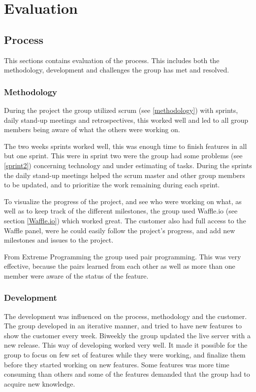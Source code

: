 
\chapter{Evaluation}

\section{Process}
\label{evaluationProcess}
This sections contains evaluation of the process. This includes both the methodology, development and challenges the group has met and resolved.

\subsection{Methodology}
\label{evaluationMethodology}
During the project the group utilized scrum (see \ref{methodology}) with sprints, daily stand-up meetings and retrospectives, this worked well and led to all group members being aware of what the others were working on. 

The two weeks sprints worked well, this was enough time to finish features in all but one sprint. This were in sprint two were the group had some problems (see \ref{sprint2}) concerning technology and under estimating of tasks. During the sprints the daily stand-up meetings helped the scrum master and other group members to be updated, and to prioritize the work remaining during each sprint. 

To visualize the progress of the project, and see who were working on what, as well as to keep track of the different milestones, the group used Waffle.io (see section \ref{Waffle.io}) which worked great. The customer also had full access to the Waffle panel, were he could easily follow the project's progress, and add new milestones and issues to the project.

From Extreme Programming the group used pair programming. This was very effective, because the pairs learned from each other as well as more than one member were aware of the status of the feature. 




\subsection{Development}

The development was influenced on the process, methodology and the customer. The group developed in an iterative manner, and tried to have new features to show the customer every week. Biweekly the group updated the live server with a new release. This way of developing worked very well. It made it possible for the group to focus on few set of features while they were working, and finalize them before they started working on new features. Some features was more time consuming than others and some of the features demanded that the group had to acquire new knowledge. 

